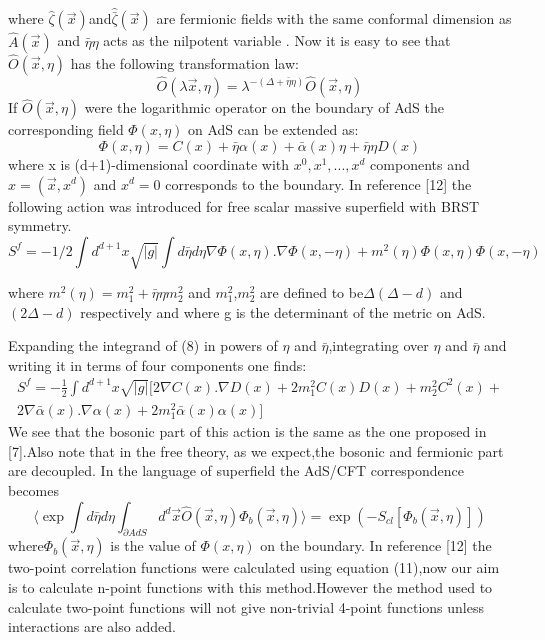 \documentclass[a4paper,12pt]{article}
\begin{document}
  where $\hat{\zeta}(\vec{x})$and$
 \hat{\bar{\zeta}}(\vec{x})$ are fermionic
 fields with the same conformal dimension as $
 \hat{A}(\vec{x})$ and $ \bar{\eta}\eta $ acts
 as the nilpotent variable .
 Now it is easy to see that $\hat{O}(\vec{x},\eta)$ has the following
 transformation law:
  \begin{equation}\label{eq:a5}
  \hat{O}(\lambda\vec{x},\eta)=\lambda^{-(\Delta+\bar{\eta}\eta)}\hat{O}(\vec{x},\eta)
  \end{equation}
  If $ \hat{O}(\vec{x},\eta)$ were the logarithmic
  operator on the boundary of AdS the corresponding field
  $\Phi(x,\eta)$ on AdS can be extended as:
  \begin{equation}
  \Phi(x,\eta)=C(x)+\bar{\eta}\alpha(x)+\bar{\alpha}(x)\eta+
  \bar{\eta}\eta D(x)
  \end{equation}
  where x is (d+1)-dimensional coordinate with
  $x^{0},x^{1},...,x^{d}$ components and $
  x=(\vec{x},x^{d})$ and $x^{d}=0$ corresponds to the
  boundary.
  In reference [12] the following action was introduced for free
  scalar massive superfield with BRST symmetry.
  \begin{equation}
  S^{f}=-1/2\int d^{d+1}x\sqrt{|g|}\int d\bar{\eta}d\eta
  \nabla\Phi(x,\eta).\nabla\Phi(x,-\eta)+m^{2}(\eta)\Phi(x,\eta)\Phi(x,-\eta)
  \end{equation}

   where $m^{2}(\eta)=m_{1}^{2}+\bar{\eta}\eta m_{2}^{2}$ and $ m_{1}^{2}$,$m_{2}^{2}$ are defined to be$\Delta(\Delta-d)$
    and $(2\Delta-d)$ respectively and where g is the determinant of  the metric on
    AdS.

  Expanding the integrand of (8) in powers of $\eta$ and
  $\bar{\eta}$,integrating over $\eta$ and
  $\bar{\eta}$ and writing it in terms of four components one
  finds:
  \begin{eqnarray}
  S^{f}=-\frac{1}{2}\int d^{d+1}x\sqrt{|g|}[2\nabla C(x).\nabla
  D(x)+2m_{1}^{2}C(x)D(x)+m_{2}^{2}C^{2}(x)+   \nonumber\\
  2\nabla\bar{\alpha}(x).\nabla\alpha(x)+2m_{1}^{2}\bar{\alpha}(x)\alpha(x)]
  \end{eqnarray}
    We see that the bosonic part of this action is the same as the
  one proposed in [7].Also note that in the free theory, as we
  expect,the bosonic and fermionic part are decoupled.
  In the language of superfield the AdS/CFT correspondence becomes
  \begin{equation}
  \langle\exp\int d\bar{\eta}d\eta\int_{\partial AdS}d^{d}\vec{x}
     \hat{O}(\vec{x},\eta)\Phi_{b}(\vec{x},\eta)\rangle=\exp(-S_{cl}[\Phi_{b}(\vec{x},\eta)])
  \end{equation}
  where$ \Phi_{b}(\vec{x},\eta)$ is the value of $\Phi(x,\eta)$ on the
  boundary.
  In reference [12] the two-point correlation functions were
  calculated using equation (11),now our aim is to calculate
  n-point functions with this method.However the method used to
  calculate two-point functions will not give non-trivial 4-point
  functions unless interactions are also added.
\end{document}
